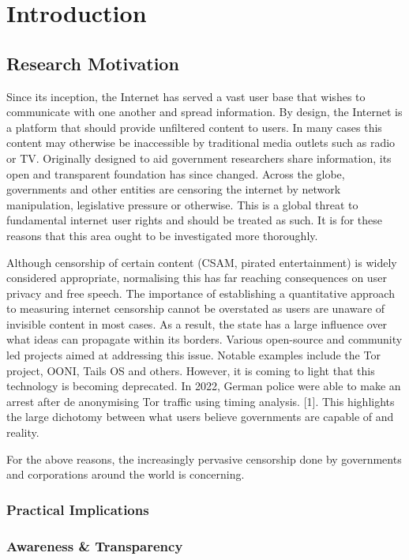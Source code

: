 \chapter{Introduction}

\section{Research Motivation}

Since its inception, the Internet has served a vast user base that wishes to communicate with one another and spread information. By design, the Internet is a platform that should provide unfiltered content to users. In many cases this content may otherwise be inaccessible by traditional media outlets such as radio or TV. Originally designed to aid government researchers share information, its open and transparent foundation has since changed. Across the globe, governments and other entities are censoring the internet by network manipulation, legislative pressure or otherwise. This is a global threat to fundamental internet user rights and should be treated as such. It is for these reasons that this area ought to be investigated more thoroughly.

Although censorship of certain content (CSAM, pirated entertainment) is widely considered appropriate, normalising this has far reaching consequences on user privacy and free speech. The importance of establishing a quantitative approach to measuring internet censorship cannot be overstated as users are unaware of invisible content in most cases. As a result, the state has a large influence over what ideas can propagate within its borders. Various open-source and community led projects aimed at addressing this issue. Notable examples include the Tor project, OONI, Tails OS and others. However, it is coming to light that this technology is becoming deprecated. In 2022, German police were able to make an arrest after de anonymising Tor traffic using timing analysis. [1]. This highlights the large dichotomy between what users believe governments are capable of and reality. 



For the above reasons, the increasingly pervasive censorship done by governments and corporations around the world is concerning.  


\subsection{Practical Implications}
\subsection{Awareness \& Transparency}
